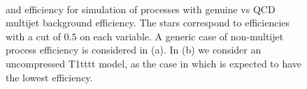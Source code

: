 \begin{figure}[!h]
 \centering
 ~
  \\
 \caption{\bdphi and \dphimhtj efficiency for simulation of processes with genuine
 \met vs QCD multijet background efficiency. The stars correspond to
 efficiencies with a cut of $0.5$ on each variable. A generic case of
 non-multijet process efficiency is considered in (a). In (b) we
 consider an uncompressed T1tttt model, as the case in which \bdphi is
 expected to have the lowest efficiency.}
 \label{fig:bDPhi_roc}
\end{figure}

